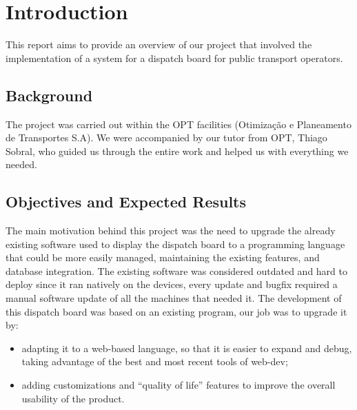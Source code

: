 \documentclass[10pt]{article}
\begin{document}
\clearpage

\section{Introduction}
    This report aims to provide an overview of our project that involved the implementation of a system for a dispatch board for public transport operators.

    \subsection{Background}
    The project was carried out within the OPT facilities (Otimização e Planeamento de Transportes S.A). We were accompanied by our tutor from OPT, Thiago Sobral, who guided us through the entire work and helped us with everything we needed.

    \subsection{Objectives and Expected Results}
        The main motivation behind this project was the need to upgrade the already existing software used to display the dispatch board to a programming language that could be more easily managed, maintaining the existing features, and database integration.
        The existing software was considered outdated and hard to deploy since it ran natively on the devices, every update and bugfix required a manual software update of all the machines that needed it.
        The development of this dispatch board was based on an existing program, our job was to upgrade it by:
        \begin{itemize}
            \item adapting it to a web-based language, so that it is easier to expand and debug, taking advantage of the best and most recent tools of web-dev;
            \item adding customizations and “quality of life” features to improve the overall usability of the product.
        \end{itemize}
\end{document}
